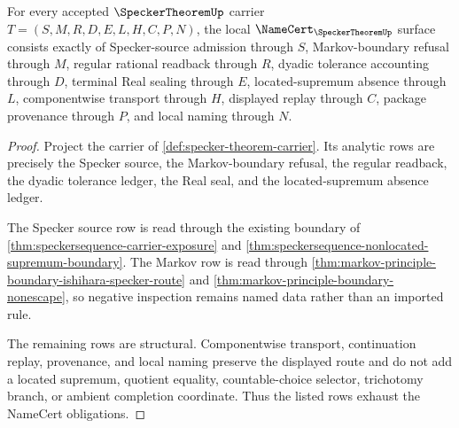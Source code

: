\begin{theorem}
\label{thm:specker-theorem-namecert-obligations}
For every accepted $\SpeckerTheoremUp$ carrier $T=(S,M,R,D,E,L,H,C,P,N)$, the local $\NameCert_{\SpeckerTheoremUp}$ surface consists exactly of Specker-source admission through $S$, Markov-boundary refusal through $M$, regular rational readback through $R$, dyadic tolerance accounting through $D$, terminal Real sealing through $E$, located-supremum absence through $L$, componentwise transport through $H$, displayed replay through $C$, package provenance through $P$, and local naming through $N$.
\end{theorem}
\begin{proof}
Project the carrier of \autoref{def:specker-theorem-carrier}. Its analytic rows are precisely the Specker source, the Markov-boundary refusal, the regular readback, the dyadic tolerance ledger, the Real seal, and the located-supremum absence ledger.

The Specker source row is read through the existing boundary of \autoref{thm:speckersequence-carrier-exposure} and \autoref{thm:speckersequence-nonlocated-supremum-boundary}. The Markov row is read through \autoref{thm:markov-principle-boundary-ishihara-specker-route} and \autoref{thm:markov-principle-boundary-nonescape}, so negative inspection remains named data rather than an imported rule.

The remaining rows are structural. Componentwise transport, continuation replay, provenance, and local naming preserve the displayed route and do not add a located supremum, quotient equality, countable-choice selector, trichotomy branch, or ambient completion coordinate. Thus the listed rows exhaust the NameCert obligations.
\end{proof}

